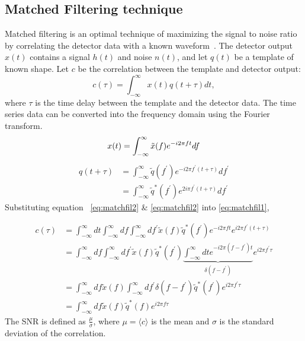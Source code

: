 \documentclass{ttuthes2007}
\begin{document}
\subsection{Matched Filtering technique}
Matched filtering is an optimal technique of maximizing the signal to noise ratio by
correlating the detector data with a known waveform~\cite{Sathyaprakash_2009}.
The detector output $x(t)$ contains a signal $h(t)$ and noise $n(t)$, and let
$q(t)$ be
a template of known shape. Let $c$ be the correlation between the template and
detector output:
\begin{equation}\label{eq:matchfil1}
c(\tau) = \int_{-\infty}^{\infty} x(t)q(t+\tau)dt,
\end{equation}
where $\tau$ is the time delay between the template and the detector data.
The time series data can be converted into the frequency domain using the Fourier
transform. 
\begin{equation}\label{eq:matchfil2}
x(t)=\int_{-\infty}^{\infty} \tilde{x}(f)e^{-i2\pi f t} df\\
\end{equation}
\begin{equation}\label{eq:matchfil3}
\begin{split}
q(t+\tau) &=\int_{-\infty}^{\infty} \tilde{q}(f^{'})e^{-i2\pi f^{'}(t+\tau)}
df^{'}\\
 & =\int_{-\infty}^{\infty} \tilde{q}^{*}(f^{'})e^{2i\pi f^{'}(t+\tau)} df^{'}
\end{split}
\end{equation}
Substituting equation ~\ref{eq:matchfil2} \& \ref{eq:matchfil2} into \ref{eq:matchfil1},

\begin{align*}
c(\tau) &= \int_{-\infty}^{\infty} dt \int_{-\infty}^{\infty}
df\int_{-\infty}^{\infty} df^{'} \tilde{x}(f)\tilde{q}^*(f^{'}) e^{-i2\pi
ft}e^{i2\pi f^{'}(t+\tau)}\\
  & = \int_{-\infty}^{\infty} df \int_{-\infty}^{\infty} df^{'}
\tilde{x}(f)\tilde{q}^*(f^{'})\underbrace{\int_{-\infty}^{\infty} dt e^{-i 2\pi
(f-f^{'})t}}_{\delta(f-f^{'})}
e^{i 2\pi f^{'}\tau}\\
 & = \int_{-\infty}^{\infty}df\tilde{x}(f)
\int_{-\infty}^{\infty} df^{'}\delta(f-f^{'})\tilde{q}^*(f^{'})e^{i 2\pi
f^{'}\tau}\\
 & = \int_{-\infty}^{\infty}df\tilde{x}(f)\tilde{q}^{*}(f)e^{i 2\pi f\tau}
\end{align*}
The \ac{SNR} is defined as $\frac{\mu}{\sigma}$, where $\mu=\langle c \rangle$
is the mean and
$\sigma$ is the standard deviation of the correlation.
\end{document}
